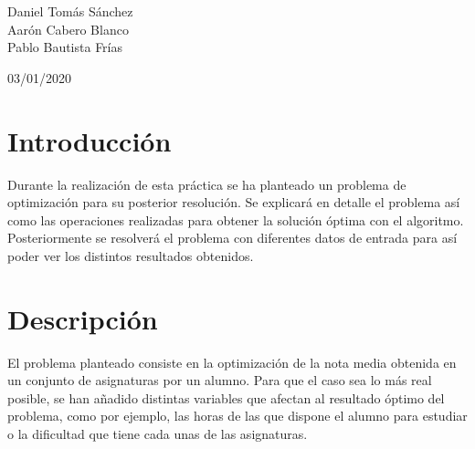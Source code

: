 \documentclass[11pt, a4paper, titlepage]{article}
\begin{document}
	\begin{titlepage}
    	\begin{center}
        	\hrulefill

        	\vspace{0.5cm}
        	{\bf\fontsize{25}{0}{\selectfont{Optimización Heurística\\[0.5cm]}}}
        	\fontsize{15}{0}{\selectfont{Optimizar una calificación\\[0.5cm]}}
        	\hrulefill
        	\vspace{6.0cm}
    	\end{center}

    	\centering
    	{\Large Daniel Tomás Sánchez\\ Aarón Cabero Blanco \\ Pablo Bautista 				Frías \par}
    	\vspace{2cm}
    	{\Large 03/01/2020 \par}
	\end{titlepage}

\newpage


\tableofcontents

\newpage

\section{Introducción}
Durante la realización de esta práctica se ha planteado un problema de optimización para su posterior resolución. Se explicará en detalle el problema así como las operaciones realizadas para obtener la solución óptima con el algoritmo. Posteriormente se resolverá el problema con diferentes datos de entrada para así poder ver los distintos resultados obtenidos.

\newpage

\section{Descripción}
El problema planteado consiste en la optimización de la nota media obtenida en un conjunto de asignaturas por un alumno. Para que el caso sea lo más real posible, se han añadido distintas variables que afectan al resultado óptimo del problema, como por ejemplo, las horas de las que dispone el alumno para estudiar o la dificultad que tiene cada unas de las asignaturas.
\end{document}
